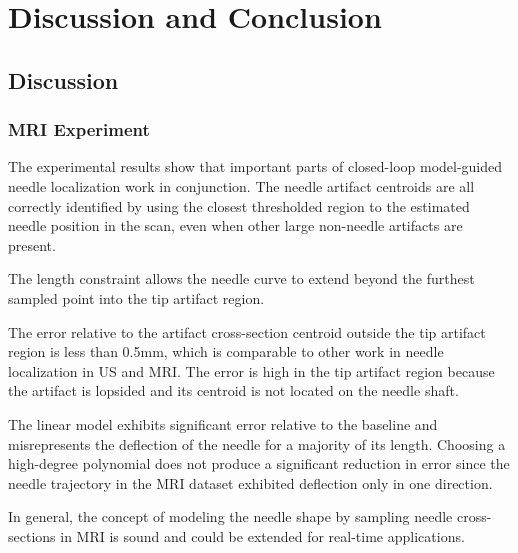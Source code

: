 \chapter{Discussion and Conclusion}
\label{sec:conclusions} %


\section{Discussion}
\subsection{MRI Experiment}
The experimental results show that important parts of closed-loop model-guided needle localization work in conjunction. The needle artifact centroids are all correctly identified by using the closest thresholded region to the estimated needle position in the scan, even when other large non-needle artifacts are present.

The length constraint allows the needle curve to extend beyond the furthest sampled point into the tip artifact region.

The error relative to the artifact cross-section centroid outside the tip artifact region is less than 0.5mm, which is comparable to other work in needle localization in US\cite{rossa_adaptive_2016} and MRI\cite{song_biopsy_2012}. The error is high in the tip artifact region because the artifact is lopsided and its centroid is not located on the needle shaft.

The linear model exhibits significant error relative to the baseline and misrepresents the deflection of the needle for a majority of its length. Choosing a high-degree polynomial does not produce a significant reduction in error since the needle trajectory in the MRI dataset exhibited deflection only in one direction.

In general, the concept of modeling the needle shape by sampling needle cross-sections in MRI is sound and could be extended for real-time applications.



